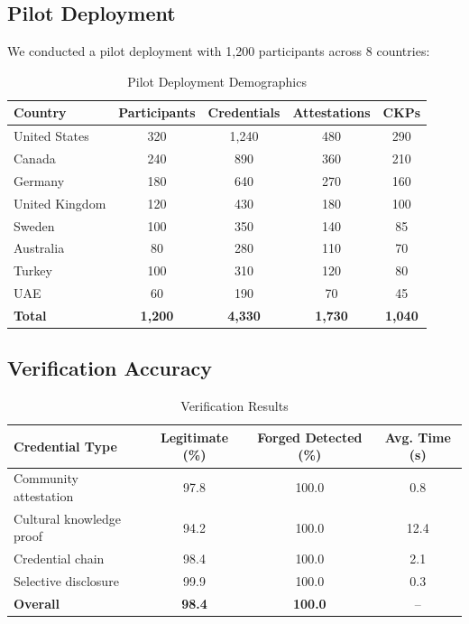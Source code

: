 \documentclass[11pt,a4paper]{article}
\begin{document}
\subsection{Pilot Deployment}

We conducted a pilot deployment with 1{,}200 participants across 8 countries:

\begin{table}[H]
\centering
\caption{Pilot Deployment Demographics}
\label{tab:pilot}
\begin{tabular}{lcccc}
\toprule
\textbf{Country} & \textbf{Participants} & \textbf{Credentials} & \textbf{Attestations} & \textbf{CKPs} \\
\midrule
United States & 320 & 1{,}240 & 480 & 290 \\
Canada & 240 & 890 & 360 & 210 \\
Germany & 180 & 640 & 270 & 160 \\
United Kingdom & 120 & 430 & 180 & 100 \\
Sweden & 100 & 350 & 140 & 85 \\
Australia & 80 & 280 & 110 & 70 \\
Turkey & 100 & 310 & 120 & 80 \\
UAE & 60 & 190 & 70 & 45 \\
\midrule
\textbf{Total} & \textbf{1{,}200} & \textbf{4{,}330} & \textbf{1{,}730} & \textbf{1{,}040} \\
\bottomrule
\end{tabular}
\end{table}

\subsection{Verification Accuracy}

\begin{table}[H]
\centering
\caption{Verification Results}
\label{tab:verification}
\begin{tabular}{lccc}
\toprule
\textbf{Credential Type} & \textbf{Legitimate (\%)} & \textbf{Forged Detected (\%)} & \textbf{Avg. Time (s)} \\
\midrule
Community attestation & 97.8 & 100.0 & 0.8 \\
Cultural knowledge proof & 94.2 & 100.0 & 12.4 \\
Credential chain & 98.4 & 100.0 & 2.1 \\
Selective disclosure & 99.9 & 100.0 & 0.3 \\
\midrule
\textbf{Overall} & \textbf{98.4} & \textbf{100.0} & -- \\
\bottomrule
\end{tabular}
\end{table}
\end{document}
